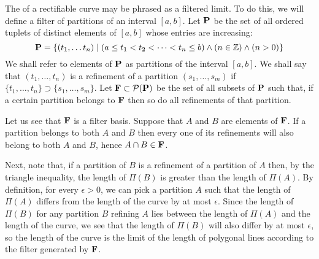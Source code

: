 \documentclass[12pt]{article}
\begin{document}

The  of a rectifiable curve may be phrased as a filtered limit.
To do this, we will define a filter of partitions of an interval
$[a,b]$.  Let ${\bf P}$ be the set of all ordered tuplets of distinct
elements of $[a,b]$ whose entries are increasing: 
 \[{\bf P} = \{ (t_1, \ldots t_n) \mid ( a \le t_1 < t_2 < \cdots < t_n \le b) \wedge
 (n \in \mathbb{Z}) \wedge (n > 0) \}\]
 We shall refer to elements of ${\bf P}$ as partitions of the interval
$[a,b]$.  We shall say that $(t_1, \ldots ,t_n)$ is a refinement of a
partition $(s_1, \ldots, s_m)$ if $\{t_1, \ldots ,t_n\} \supset \{s_1,
\ldots, s_m\}$.  Let ${\bf F} \subset \mathcal{P} ({\bf P})$ be the
set of all subsets of ${\bf P}$ such that, if a certain partition
belongs to ${\bf F}$ then so do all refinements of that partition.

Let us see that ${\bf F}$ is a filter basis.  Suppose that $A$ and $B$
are elements of ${\bf F}$.  If a partition belongs to both $A$ and $B$
then every one of its refinements will also belong to both $A$ and
$B$, hence $A \cap B \in {\bf F}$.

Next, note that, if a partition of $B$ is a refinement of a partition
of $A$ then, by the triangle inequality, the length of $\Pi (B)$ is
greater than the length of $\Pi (A)$.  By definition, for every
$\epsilon > 0$, we can pick a partition $A$ such that the length of
$\Pi(A)$ differs from the length of the curve by at most $\epsilon$.
Since the length of $\Pi(B)$ for any partition $B$ refining $A$ lies
between the length of $\Pi(A)$ and the length of the curve, we see
that the length of $\Pi(B)$ will also differ by at most $\epsilon$, so
the length of the curve is the limit of the length of polygonal lines
according to the filter generated by ${\bf F}$.
\end{document}
